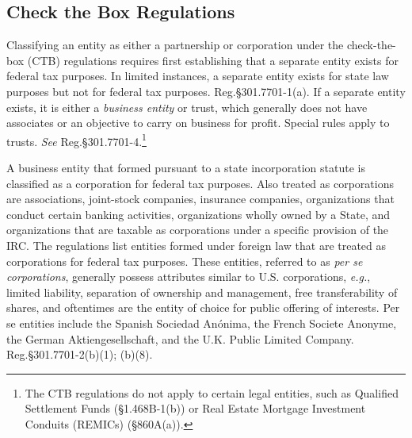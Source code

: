 
	\subsection{Check the Box Regulations}
	
Classifying an entity as either a partnership or corporation under the check-the-box (CTB) regulations requires first establishing that a separate entity exists for federal tax purposes.  In limited instances, a separate entity exists for state law purposes but not for federal tax purposes.  Reg.\@ \S301.7701-1(a).  If a separate entity exists, it is either a \emph{business entity} or trust, which generally does not have associates or an objective to carry on business for profit.  Special rules apply to trusts.  \emph{See} Reg.\@ \S301.7701-4.\footnote{The CTB regulations do not apply to certain legal entities, such as Qualified Settlement Funds (\S1.468B-1(b)) or Real Estate Mortgage Investment Conduits (REMICs) (\S 860A(a)).}

A business entity that formed pursuant to a state incorporation statute is classified as a corporation for federal tax purposes.  Also treated as corporations are associations, joint-stock companies, insurance companies, organizations that conduct certain banking activities, organizations wholly owned by a State, and organizations that are taxable as corporations under a specific provision of the IRC.  The regulations list entities formed under foreign law that are treated as corporations for federal tax purposes.  These entities, referred to as \emph{per se corporations}, generally possess attributes similar to U.S. corporations, \textit{e.g.}, limited liability, separation of ownership and management, free transferability of shares, and oftentimes are the entity of choice for public offering of interests.  Per se entities  include the Spanish Sociedad An\'{o}nima, the French Societe Anonyme, the German Aktiengesellschaft, and the U.K. Public Limited Company.  Reg.\@ \S 301.7701-2(b)(1); (b)(8).  

